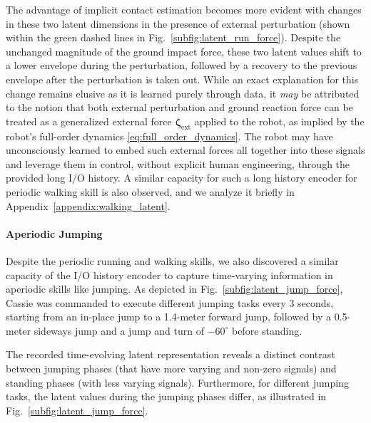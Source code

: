 The advantage of implicit contact estimation becomes more evident with changes in these two latent dimensions in the presence of external perturbation (shown within the green dashed lines in Fig.~\ref{subfig:latent_run_force}). 
Despite the unchanged magnitude of the ground impact force, these two latent values shift to a lower envelope during the perturbation, followed by a recovery to the previous envelope after the perturbation is taken out. 
While an exact explanation for this change remains elusive as it is learned purely through data, it \emph{may} be attributed to the notion that both external perturbation and ground reaction force can be treated as a generalized external force $\bm{\zeta}_{\text{ext}}$ applied to the robot, as implied by the robot's full-order dynamics \eqref{eq:full_order_dynamics}. 
The robot may have unconsciously learned to embed such external forces all together into these signals and leverage them in control, without explicit human engineering, through the provided long I/O history. 
A similar capacity for such a long history encoder for periodic walking skill is also observed, and we analyze it briefly in Appendix~\ref{appendix:walking_latent}.  

\paragraph{Aperiodic Jumping}
Despite the periodic running and walking skills, we also discovered a similar capacity of the I/O history encoder to capture time-varying information in aperiodic skills like jumping. 
As depicted in Fig.~\ref{subfig:latent_jump_force}, Cassie was commanded to execute different jumping tasks every 3 seconds, starting from an in-place jump to a 1.4-meter forward jump, followed by a 0.5-meter sideways jump and a jump and turn of $-60^\circ$ before standing. 

The recorded time-evolving latent representation reveals a distinct contrast between jumping phases (that have more varying and non-zero signals) and standing phases (with less varying signals). 
Furthermore, for different jumping tasks, the latent values during the jumping phases differ, as illustrated in Fig.~\ref{subfig:latent_jump_force}.

